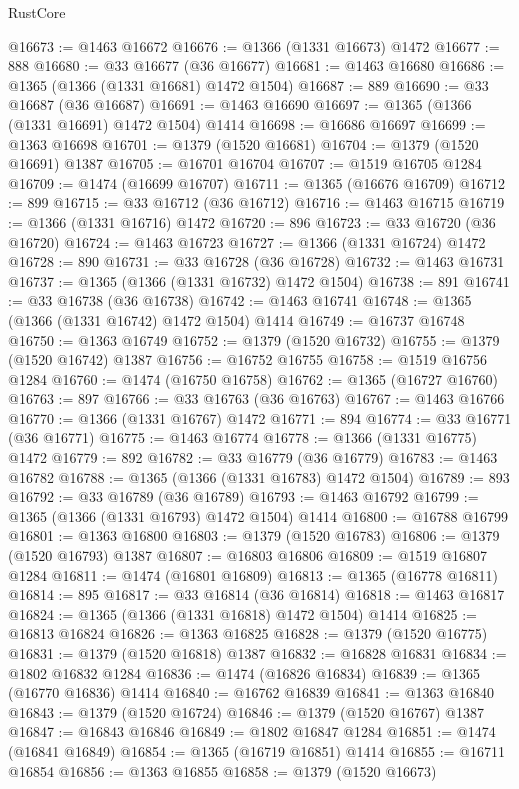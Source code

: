 \begin{lexlean}{RustCore}
\begin{coremodule}
@16673 := @1463 @16672
@16676 := @1366 (@1331 @16673) @1472
@16677 := 888
@16680 := @33 @16677 (@36 @16677)
@16681 := @1463 @16680
@16686 := @1365 (@1366 (@1331 @16681) @1472 @1504)
@16687 := 889
@16690 := @33 @16687 (@36 @16687)
@16691 := @1463 @16690
@16697 := @1365 (@1366 (@1331 @16691) @1472 @1504) @1414
@16698 := @16686 @16697
@16699 := @1363 @16698
@16701 := @1379 (@1520 @16681)
@16704 := @1379 (@1520 @16691) @1387
@16705 := @16701 @16704
@16707 := @1519 @16705 @1284
@16709 := @1474 (@16699 @16707)
@16711 := @1365 (@16676 @16709)
@16712 := 899
@16715 := @33 @16712 (@36 @16712)
@16716 := @1463 @16715
@16719 := @1366 (@1331 @16716) @1472
@16720 := 896
@16723 := @33 @16720 (@36 @16720)
@16724 := @1463 @16723
@16727 := @1366 (@1331 @16724) @1472
@16728 := 890
@16731 := @33 @16728 (@36 @16728)
@16732 := @1463 @16731
@16737 := @1365 (@1366 (@1331 @16732) @1472 @1504)
@16738 := 891
@16741 := @33 @16738 (@36 @16738)
@16742 := @1463 @16741
@16748 := @1365 (@1366 (@1331 @16742) @1472 @1504) @1414
@16749 := @16737 @16748
@16750 := @1363 @16749
@16752 := @1379 (@1520 @16732)
@16755 := @1379 (@1520 @16742) @1387
@16756 := @16752 @16755
@16758 := @1519 @16756 @1284
@16760 := @1474 (@16750 @16758)
@16762 := @1365 (@16727 @16760)
@16763 := 897
@16766 := @33 @16763 (@36 @16763)
@16767 := @1463 @16766
@16770 := @1366 (@1331 @16767) @1472
@16771 := 894
@16774 := @33 @16771 (@36 @16771)
@16775 := @1463 @16774
@16778 := @1366 (@1331 @16775) @1472
@16779 := 892
@16782 := @33 @16779 (@36 @16779)
@16783 := @1463 @16782
@16788 := @1365 (@1366 (@1331 @16783) @1472 @1504)
@16789 := 893
@16792 := @33 @16789 (@36 @16789)
@16793 := @1463 @16792
@16799 := @1365 (@1366 (@1331 @16793) @1472 @1504) @1414
@16800 := @16788 @16799
@16801 := @1363 @16800
@16803 := @1379 (@1520 @16783)
@16806 := @1379 (@1520 @16793) @1387
@16807 := @16803 @16806
@16809 := @1519 @16807 @1284
@16811 := @1474 (@16801 @16809)
@16813 := @1365 (@16778 @16811)
@16814 := 895
@16817 := @33 @16814 (@36 @16814)
@16818 := @1463 @16817
@16824 := @1365 (@1366 (@1331 @16818) @1472 @1504) @1414
@16825 := @16813 @16824
@16826 := @1363 @16825
@16828 := @1379 (@1520 @16775)
@16831 := @1379 (@1520 @16818) @1387
@16832 := @16828 @16831
@16834 := @1802 @16832 @1284
@16836 := @1474 (@16826 @16834)
@16839 := @1365 (@16770 @16836) @1414
@16840 := @16762 @16839
@16841 := @1363 @16840
@16843 := @1379 (@1520 @16724)
@16846 := @1379 (@1520 @16767) @1387
@16847 := @16843 @16846
@16849 := @1802 @16847 @1284
@16851 := @1474 (@16841 @16849)
@16854 := @1365 (@16719 @16851) @1414
@16855 := @16711 @16854
@16856 := @1363 @16855
@16858 := @1379 (@1520 @16673)

\end{coremodule}
\end{lexlean}
